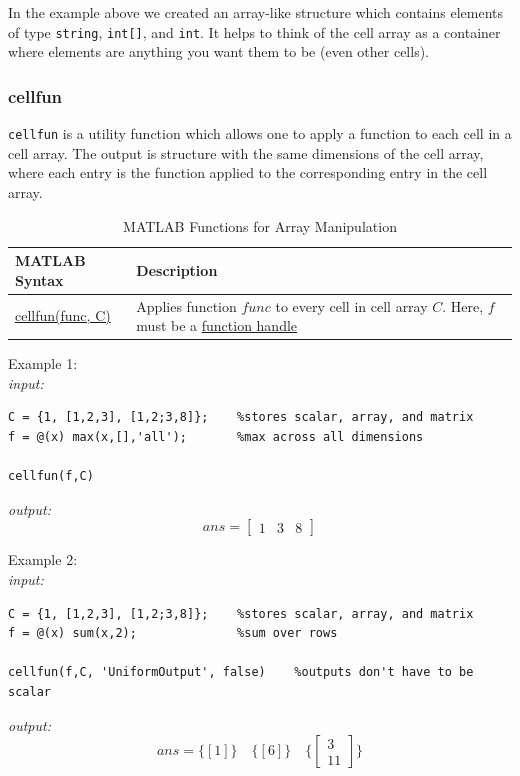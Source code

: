 \documentclass[../MATLAB_Primer.tex]{subfiles}
\begin{document}
In the example above we created an array-like structure which contains elements of type \texttt{string}, \texttt{int[]}, and \texttt{int}. It helps to think of the cell array as a container where elements are anything you want them to be (even other cells). 

\subsubsection{cellfun}
\texttt{cellfun} is a utility function which allows one to apply a function to each cell in a cell array. The output is structure with the same dimensions of the cell array, where each entry is the function applied to the corresponding entry in the cell array.\\

\begin{table}[H]
\caption{MATLAB Functions for Array Manipulation}
    \begin{center}
        \begin{tabular}{| C{3cm} | m{12cm}|}
            \hline
            \textbf{MATLAB Syntax} & \textbf{Description}\\
            
            \hline
            \href{https://www.mathworks.com/help/matlab/ref/cellfun.html}{\color{blue}cellfun(func, C)} & Applies function $func$ to every cell in cell array $C$.  Here, $f$ must be a \href{https://www.mathworks.com/help/matlab/matlab_prog/creating-a-function-handle.html}{\color{blue}function handle}\\
            \hline
            
        \end{tabular}
        \label{tab:cell_array}
    \end{center}
\end{table}

Example 1:\\

\textit{input:}
\begin{lstlisting}
C = {1, [1,2,3], [1,2;3,8]};    %stores scalar, array, and matrix
f = @(x) max(x,[],'all');       %max across all dimensions

cellfun(f,C)
\end{lstlisting}
\textit{output:}
$$
    ans = 
    \begin{bmatrix}
    1 & 3 & 8
    \end{bmatrix}
$$

Example 2:\\

\textit{input:}
\begin{lstlisting}
C = {1, [1,2,3], [1,2;3,8]};    %stores scalar, array, and matrix
f = @(x) sum(x,2);              %sum over rows 

cellfun(f,C, 'UniformOutput', false)    %outputs don't have to be scalar
\end{lstlisting}
\textit{output:}
$$
    ans = 
    \{[1]\} \quad \{[6]\} \quad 
    \{\begin{bmatrix}
    3\\11
    \end{bmatrix}\}
$$
\end{document}
